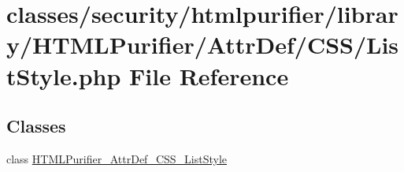 \hypertarget{ListStyle_8php}{\section{classes/security/htmlpurifier/library/\+H\+T\+M\+L\+Purifier/\+Attr\+Def/\+C\+S\+S/\+List\+Style.php File Reference}
\label{ListStyle_8php}
}
\subsection*{Classes}
\begin{DoxyCompactItemize}
\item 
class \hyperlink{classHTMLPurifier__AttrDef__CSS__ListStyle}{H\+T\+M\+L\+Purifier\+\_\+\+Attr\+Def\+\_\+\+C\+S\+S\+\_\+\+List\+Style}
\end{DoxyCompactItemize}

